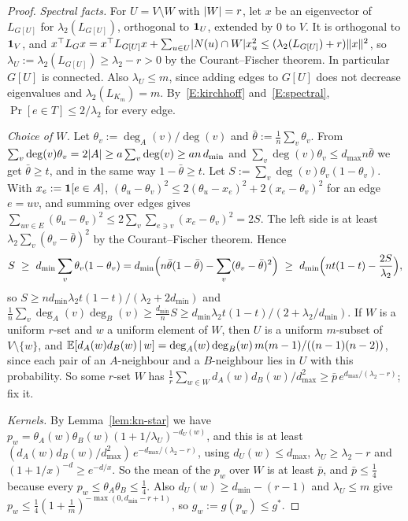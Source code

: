 \begin{proof}
\emph{Spectral facts.} For $U=V\setminus W$ with $\lvert W\rvert=r$, let $x$ be an eigenvector of $L_{G[U]}$ for $\lambda_2(L_{G[U]})$, orthogonal to $\mathbf{1}_U$, extended by $0$ to $V$. It is orthogonal to $\mathbf{1}_V$, and $x^\top L_Gx=x^\top L_{G[U]}x+\sum_{u\in U}\lvert N(u)\cap W\rvert x_u^2\le(\lambda_2(L_{G[U]})+r)\lVert x\rVert^2$, so $\lambda_U:=\lambda_2(L_{G[U]})\ge\lambda_2-r>0$ by the Courant--Fischer theorem. In particular $G[U]$ is connected. Also $\lambda_U\le m$, since adding edges to $G[U]$ does not decrease eigenvalues and $\lambda_2(L_{K_m})=m$. By~\ref{E:kirchhoff} and~\ref{E:spectral}, $\Pr[e\in T]\le2/\lambda_2$ for every edge.

\emph{Choice of $W$.} Let $\theta_v:=\deg_A(v)/\deg(v)$ and $\bar\theta:=\frac1n\sum_v\theta_v$. From $\sum_v\deg(v)\theta_v=2\lvert A\rvert\ge a\sum_v\deg(v)\ge an\,d_{\min}$ and $\sum_v\deg(v)\theta_v\le d_{\max}n\bar\theta$ we get $\bar\theta\ge t$, and in the same way $1-\bar\theta\ge t$. Let $S:=\sum_v\deg(v)\theta_v(1-\theta_v)$. With $x_e:=\mathbf{1}[e\in A]$, $(\theta_u-\theta_v)^2\le2(\theta_u-x_e)^2+2(x_e-\theta_v)^2$ for an edge $e=uv$, and summing over edges gives $\sum_{uv\in E}(\theta_u-\theta_v)^2\le2\sum_v\sum_{e\ni v}(x_e-\theta_v)^2=2S$. The left side is at least $\lambda_2\sum_v(\theta_v-\bar\theta)^2$ by the Courant--Fischer theorem. Hence
\[
  S\ \ge\ d_{\min}\sum_v\theta_v(1-\theta_v)=d_{\min}\Bigl(n\bar\theta(1-\bar\theta)-\sum_v(\theta_v-\bar\theta)^2\Bigr)\ \ge\ d_{\min}\Bigl(nt(1-t)-\frac{2S}{\lambda_2}\Bigr),
\]
so $S\ge nd_{\min}\lambda_2t(1-t)/(\lambda_2+2d_{\min})$ and $\frac1n\sum_v\deg_A(v)\deg_B(v)\ge\frac{d_{\min}}nS\ge d_{\min}\lambda_2t(1-t)/(2+\lambda_2/d_{\min})$. If $W$ is a uniform $r$-set and $w$ a uniform element of $W$, then $U$ is a uniform $m$-subset of $V\setminus\{w\}$, and $\mathbb{E}[d_A(w)d_B(w)\,|\,w]=\deg_A(w)\deg_B(w)\,m(m-1)/((n-1)(n-2))$, since each pair of an $A$-neighbour and a $B$-neighbour lies in $U$ with this probability. So some $r$-set $W$ has $\frac1r\sum_{w\in W}d_A(w)d_B(w)/d_{\max}^2\ge\bar p\,e^{d_{\max}/(\lambda_2-r)}$; fix it.

\emph{Kernels.} By Lemma~\ref{lem:kn-star} we have $p_w=\theta_A(w)\theta_B(w)(1+1/\lambda_U)^{-d_U(w)}$, and this is at least $(d_A(w)d_B(w)/d_{\max}^2)\,e^{-d_{\max}/(\lambda_2-r)}$, using $d_U(w)\le d_{\max}$, $\lambda_U\ge\lambda_2-r$ and $(1+1/x)^{-d}\ge e^{-d/x}$. So the mean of the $p_w$ over $W$ is at least $\bar p$, and $\bar p\le\frac14$ because every $p_w\le\theta_A\theta_B\le\frac14$. Also $d_U(w)\ge d_{\min}-(r-1)$ and $\lambda_U\le m$ give $p_w\le\frac14(1+\frac1m)^{-\max(0,d_{\min}-r+1)}$, so $g_w:=g(p_w)\le g^*$.


\end{proof}
